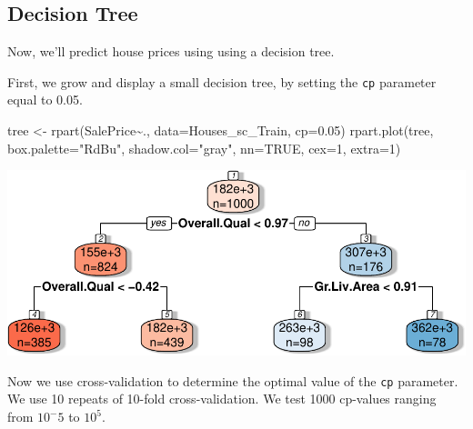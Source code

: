 \documentclass[
  letterpaper,
  DIV=11,
  numbers=noendperiod]{scrreprt}
\newenvironment{Shaded}{\begin{snugshade}}{\end{snugshade}}
\newcommand{\AttributeTok}[1]{\textcolor[rgb]{0.40,0.45,0.13}{#1}}
\newcommand{\ConstantTok}[1]{\textcolor[rgb]{0.56,0.35,0.01}{#1}}
\newcommand{\DecValTok}[1]{\textcolor[rgb]{0.68,0.00,0.00}{#1}}
\newcommand{\FloatTok}[1]{\textcolor[rgb]{0.68,0.00,0.00}{#1}}
\newcommand{\FunctionTok}[1]{\textcolor[rgb]{0.28,0.35,0.67}{#1}}
\newcommand{\NormalTok}[1]{\textcolor[rgb]{0.00,0.23,0.31}{#1}}
\newcommand{\OtherTok}[1]{\textcolor[rgb]{0.00,0.23,0.31}{#1}}
\newcommand{\SpecialCharTok}[1]{\textcolor[rgb]{0.37,0.37,0.37}{#1}}
\newcommand{\StringTok}[1]{\textcolor[rgb]{0.13,0.47,0.30}{#1}}
\begin{document}
\subsection{Decision Tree}\label{decision-tree}

Now, we'll predict house prices using using a decision tree.

First, we grow and display a small decision tree, by setting the
\texttt{cp} parameter equal to 0.05.

\begin{Shaded}
\begin{Highlighting}[]
\NormalTok{tree }\OtherTok{\textless{}{-}} \FunctionTok{rpart}\NormalTok{(SalePrice}\SpecialCharTok{\textasciitilde{}}\NormalTok{., }\AttributeTok{data=}\NormalTok{Houses\_sc\_Train, }\AttributeTok{cp=}\FloatTok{0.05}\NormalTok{)}
\FunctionTok{rpart.plot}\NormalTok{(tree, }\AttributeTok{box.palette=}\StringTok{"RdBu"}\NormalTok{, }\AttributeTok{shadow.col=}\StringTok{"gray"}\NormalTok{, }\AttributeTok{nn=}\ConstantTok{TRUE}\NormalTok{, }\AttributeTok{cex=}\DecValTok{1}\NormalTok{, }\AttributeTok{extra=}\DecValTok{1}\NormalTok{)}
\end{Highlighting}
\end{Shaded}

\includegraphics{Ch7_files/figure-pdf/unnamed-chunk-86-1.pdf}

Now we use cross-validation to determine the optimal value of the
\texttt{cp} parameter. We use 10 repeats of 10-fold cross-validation. We
test 1000 cp-values ranging from \(10^-5\) to \(10^5\).
\end{document}
